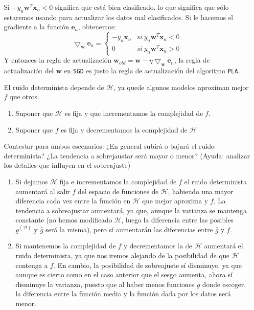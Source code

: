 \documentclass[11pt,leqno]{article}
\theoremstyle{definition}
\begin{document}
\begin{solucion}

Si $-y_n\mathbf{w}^T\mathbf{x}_n<0$ significa que está bien clasificado, lo que significa que sólo estaremos usando para actualizar los datos mal clasificados. Si le hacemos el gradiente a la función $\mathbf{e}_n$, obtenemos:
	\[ \bigtriangledown_\mathbf{w} \mathbf{e}_n = \left\lbrace
	\begin{array}{cc} -y_n \mathbf{x}_n & si \ y_n\mathbf{w}^T\mathbf{x}_n  < 0 \\
						0 & si \ y_n\mathbf{w}^T\mathbf{x}_n > 0 
	\end{array}\right. \]
	Y entonces la regla de actualización $\mathbf{w}_{old} = \mathbf{w} - \eta \bigtriangledown_\mathbf{w} \mathbf{e}_n$, la regla de actualización del $\mathbf{w}$ en \texttt{SGD} es justo la regla de actualización del algoritmo \texttt{PLA}.
\end{solucion}

\begin{cuestion}
El ruido determinista depende de $\mathcal{H}$, ya quede algunos modelos aproximan mejor $f$ que otros.
\begin{enumerate}
\item Suponer que $\mathcal{H}$ es fija y que incrementamos la complejidad de $f$.
\item Suponer que $f$ es fija y decrementamos la complejidad de $\mathcal{H}$
\end{enumerate}

Contestar para ambos escenarios: ¿En general subirá o bajará el ruido determinista? ¿La tendencia a sobrejaustar será mayor o menor? (Ayuda: analizar los detalles que influyen en el sobreajuste)
\end{cuestion}

\begin{solucion} 
\begin{enumerate}
\item Si dejamos $\mathcal{H}$ fija e incrementamos la complejidad de $f$ el ruido determinista aumentará al salir $f$ del espacio de funciones de $\mathcal{H}$, habiendo una mayor diferencia cada vez entre la función en $\mathcal{H}$ que mejor aproxima y $f$. La tendencia a sobreajustar aumentará, ya que, aunque la varianza se mantenga constante (no hemos modificado $\mathcal{H}$, luego la diferencia entre las posibles $g^{(\mathcal{D})}$ y $\bar{g}$ será la misma), pero sí aumentarán las diferencias entre $\bar{g}$ y $f$.
\item Si mantenemos la complejidad de $f$ y decrementamos la de $\mathcal{H}$ aumentará el ruido determinista, ya que nos iremos alejando de la posibilidad de que $\mathcal{H}$ contenga a $f$. En cambio, la posibilidad de sobreajuste sí disminuye, ya que aunque es cierto como en el caso anterior que el sesgo aumenta, ahora sí disminuye la varianza, puesto que al haber menos funciones $g$ donde escoger, la diferencia entre la función media y la función dada por los datos será menor.
\end{enumerate}
\end{solucion}
\end{document}
